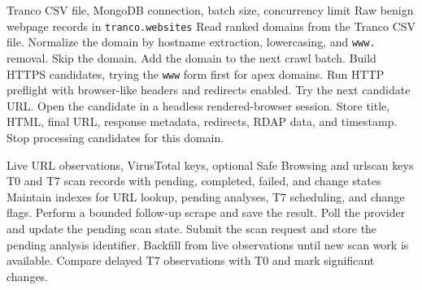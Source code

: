 \documentclass[12pt,letterpaper]{article}
\begin{document}
\begin{algorithm}[htbp]
\caption{Tranco benign webpage collection}
\label{alg:tranco-benign-collection}
\begin{algorithmic}[1]
\Require Tranco CSV file, MongoDB connection, batch size, concurrency limit
\Ensure Raw benign webpage records in \texttt{tranco.websites}
\State Read ranked domains from the Tranco CSV file.
    \State Normalize the domain by hostname extraction, lowercasing, and \texttt{www.} removal.
        \State Skip the domain.
    \Else
        \State Add the domain to the next crawl batch.
    \EndIf
\EndFor
{}
    \State Build HTTPS candidates, trying the \texttt{www} form first for apex domains.
        \State Run HTTP preflight with browser-like headers and redirects enabled.
            \State Try the next candidate URL.
        \Else
            \State Open the candidate in a headless rendered-browser session.
                \State Store title, HTML, final URL, response metadata, redirects, RDAP data, and timestamp.
                \State Stop processing candidates for this domain.
            \EndIf
        \EndIf
    \EndFor
\EndFor
\end{algorithmic}
\end{algorithm}

\begin{algorithm}[htbp]
\caption{Live scan and delayed rescan collection}
\label{alg:live-scan-collection}
\begin{algorithmic}[1]
\Require Live URL observations, VirusTotal keys, optional Safe Browsing and urlscan keys
\Ensure T0 and T7 scan records with pending, completed, failed, and change states
\State Maintain indexes for URL lookup, pending analyses, T7 scheduling, and change flags.
        \State Perform a bounded follow-up scrape and save the result.
        \State Poll the provider and update the pending scan state.
            \State Submit the scan request and store the pending analysis identifier.
        \EndIf
    \Else
        \State Backfill from live observations until new scan work is available.
    \EndIf
    \State Compare delayed T7 observations with T0 and mark significant changes.
\EndWhile
\end{algorithmic}
\end{algorithm}
\end{document}
